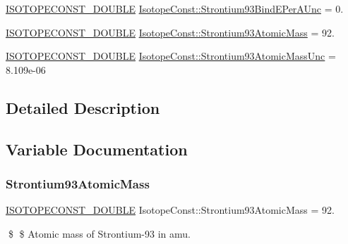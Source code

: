 \begin{DoxyCompactItemize}
\mbox{\hyperlink{group___isotope_const-_macros_ga8f45a7272ce02c0b4c65c44636ed719a}{I\+S\+O\+T\+O\+P\+E\+C\+O\+N\+S\+T\+\_\+\+D\+O\+U\+B\+LE}} \mbox{\hyperlink{group___isotope_const-_strontium-_sr93_ga4fb2f28e18ed98464efb3e2a3ed15433}{Isotope\+Const\+::\+Strontium93\+Bind\+E\+Per\+A\+Unc}} = 0.
\item 
\mbox{\hyperlink{group___isotope_const-_macros_ga8f45a7272ce02c0b4c65c44636ed719a}{I\+S\+O\+T\+O\+P\+E\+C\+O\+N\+S\+T\+\_\+\+D\+O\+U\+B\+LE}} \mbox{\hyperlink{group___isotope_const-_strontium-_sr93_ga68d749f8c3add34294779fe5b0c8358f}{Isotope\+Const\+::\+Strontium93\+Atomic\+Mass}} = 92.
\item 
\mbox{\hyperlink{group___isotope_const-_macros_ga8f45a7272ce02c0b4c65c44636ed719a}{I\+S\+O\+T\+O\+P\+E\+C\+O\+N\+S\+T\+\_\+\+D\+O\+U\+B\+LE}} \mbox{\hyperlink{group___isotope_const-_strontium-_sr93_ga272c8135ffb71c354dc6c1a79dd65554}{Isotope\+Const\+::\+Strontium93\+Atomic\+Mass\+Unc}} = 8.\+109e-\/06
\end{DoxyCompactItemize}


\subsection{Detailed Description}


\subsection{Variable Documentation}
\mbox{\label{group___isotope_const-_strontium-_sr93_ga68d749f8c3add34294779fe5b0c8358f}} 
\subsubsection{\texorpdfstring{Strontium93\+Atomic\+Mass}{Strontium93AtomicMass}}
{\footnotesize\ttfamily \mbox{\hyperlink{group___isotope_const-_macros_ga8f45a7272ce02c0b4c65c44636ed719a}{I\+S\+O\+T\+O\+P\+E\+C\+O\+N\+S\+T\+\_\+\+D\+O\+U\+B\+LE}} Isotope\+Const\+::\+Strontium93\+Atomic\+Mass = 92.}

\$ \$ Atomic mass of Strontium-\/93 in amu. \mbox{\label{group___isotope_const-_strontium-_sr93_ga272c8135ffb71c354dc6c1a79dd65554}} 
